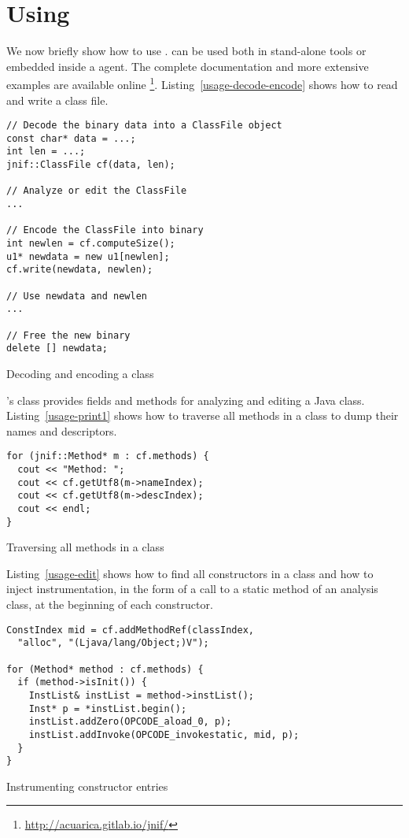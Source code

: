 \section{Using \jnif{}}\label{sec:jnif-usage}

We now briefly show how to use \jnif{}.
\jnif{} can be used both in stand-alone tools or
embedded inside a \jvmti{} agent.
The complete \api{} documentation and more extensive examples are available online%
\footnote{\url{http://acuarica.gitlab.io/jnif/}}.
Listing~\ref{usage-decode-encode} shows how to read and write a class file.

\begin{listing}
\begin{verbatim}
// Decode the binary data into a ClassFile object
const char* data = ...;
int len = ...;
jnif::ClassFile cf(data, len);

// Analyze or edit the ClassFile
...

// Encode the ClassFile into binary
int newlen = cf.computeSize();
u1* newdata = new u1[newlen];
cf.write(newdata, newlen);

// Use newdata and newlen
...

// Free the new binary
delete [] newdata;
\end{verbatim}
\caption{Decoding and encoding a class}
\label{usage-decode-encode}
\end{listing}

\jnif{}'s  class provides fields and methods for analyzing and editing a Java class.
Listing~\ref{usage-print1} shows how to traverse all methods in a class
to dump their names and descriptors.

\begin{listing}
\begin{verbatim}
for (jnif::Method* m : cf.methods) {
  cout << "Method: ";
  cout << cf.getUtf8(m->nameIndex);
  cout << cf.getUtf8(m->descIndex);
  cout << endl;
}
\end{verbatim}
\caption{Traversing all methods in a class}
\label{usage-print1}
\end{listing}

Listing~\ref{usage-edit} shows how to find all constructors in a class
and how to inject instrumentation, in the form of a call to a static method
 of an analysis class,
at the beginning of each constructor.

\begin{listing}
\begin{verbatim}
ConstIndex mid = cf.addMethodRef(classIndex, 
  "alloc", "(Ljava/lang/Object;)V");

for (Method* method : cf.methods) {
  if (method->isInit()) {
    InstList& instList = method->instList();
    Inst* p = *instList.begin();
    instList.addZero(OPCODE_aload_0, p);
    instList.addInvoke(OPCODE_invokestatic, mid, p);
  }
}
\end{verbatim}
\caption{Instrumenting constructor entries}
\label{usage-edit}
\end{listing}

